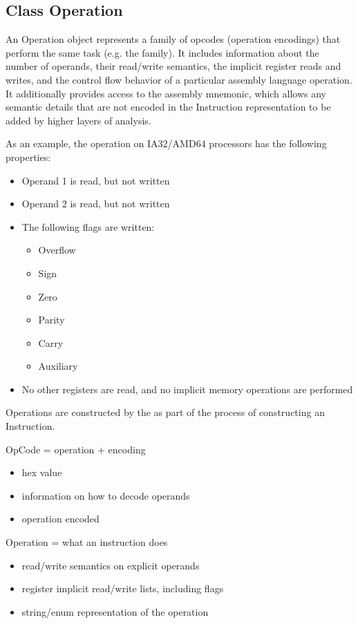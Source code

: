 \subsection{Class Operation}
\label{sec:operation}


An Operation object represents a family of opcodes (operation encodings) that
perform the same task (e.g. the  family). It includes information
about the number of operands, their read/write semantics, the implicit register
reads and writes, and the control flow behavior of a particular assembly
language operation. It additionally provides access to the assembly mnemonic,
which allows any semantic details that are not encoded in the Instruction
representation to be added by higher layers of analysis.

As an example, the  operation on IA32/AMD64 processors has the following properties:
\begin{itemize}
\item Operand 1 is read, but not written
\item Operand 2 is read, but not written
\item The following flags are written:
\begin{itemize}
\item Overflow
\item Sign
\item Zero
\item Parity
\item Carry
\item Auxiliary
\end{itemize}
\item No other registers are read, and no implicit memory operations are performed
\end{itemize}

Operations are constructed by the  as part of the
process of constructing an Instruction.

OpCode = operation + encoding
\begin{itemize}
\item hex value
\item information on how to decode operands
\item operation encoded
\end{itemize}

Operation = what an instruction does
\begin{itemize}
\item read/write semantics on explicit operands
\item register implicit read/write lists, including flags
\item string/enum representation of the operation
\end{itemize}

